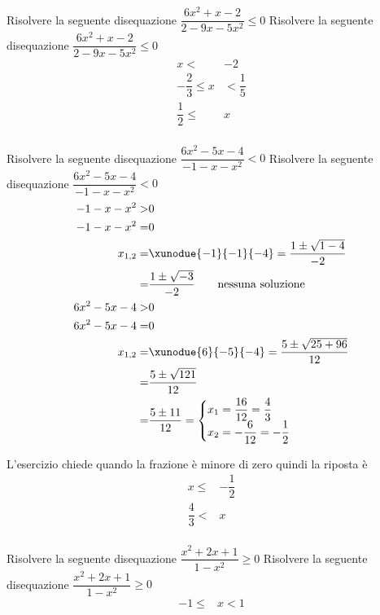 \begin{exercise}
	Risolvere la seguente disequazione $\dfrac{6x^2+x-2}{2-9x-5x^2}\leq 0$
\tcblower
Risolvere la seguente disequazione $\dfrac{6x^2+x-2}{2-9x-5x^2}\leq 0$
\begin{align*}
x<& -2\\ -\dfrac{2}{3}\leq x&< \dfrac{1}{5}\\ \dfrac{1}{2}\leq&x\\
\end{align*}
\end{exercise}
\begin{exercise}
		Risolvere la seguente disequazione $\dfrac{6x^2-5x-4}{-1-x-x^2}< 0$
	\tcblower
	Risolvere la seguente disequazione $\dfrac{6x^2-5x-4}{-1-x-x^2}< 0$
\begin{align*}
-1-x-x^2>&0\\
-1-x-x^2=&0\\
x_{1,2}=&\xunodue{-1}{-1}{-4}=\dfrac{1\pm\sqrt{1-4}}{-2}\\
=&\dfrac{1\pm\sqrt{-3}}{-2}
\qquad\text{nessuna soluzione}\\
6x^2-5x-4>&0\\
6x^2-5x-4=&0\\
x_{1,2}=&\xunodue{6}{-5}{-4}=\dfrac{5\pm\sqrt{25+96}}{12}\\
=&\dfrac{5\pm\sqrt{121}}{12}\\
=&\dfrac{5\pm 11}{12}=\begin{cases}
x_1=\dfrac{16}{12}=\dfrac{4}{3}\\
x_2=-\dfrac{6}{12}=-\dfrac{1}{2}
\end{cases}\\
\end{align*}
\begin{center}
	
\end{center}
L'esercizio chiede quando la frazione è minore di zero quindi la riposta è 
\begin{align*}
x\leq& -\dfrac{1}{2}\\  \dfrac{4}{3}<&x\\
\end{align*}
\end{exercise}
\begin{exercise}
		Risolvere la seguente disequazione $\dfrac{x^2+2x+1}{1-x^2}\geq 0$
		\tcblower
		Risolvere la seguente disequazione $\dfrac{x^2+2x+1}{1-x^2}\geq 0$
	\begin{align*}
-1\leq& x<1\\
	\end{align*}
\end{exercise}

